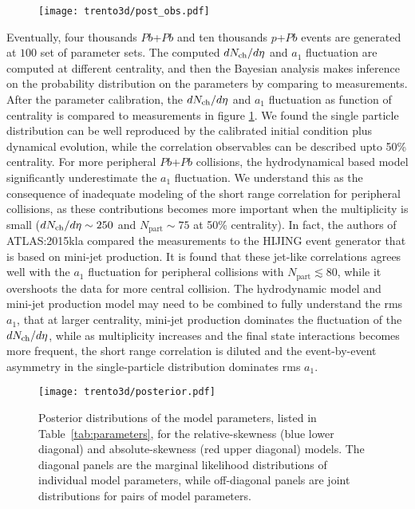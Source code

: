 \begin{figure}
\texttt{[image: trento3d/post\_obs.pdf]}
\caption{}
\label{fig:trento:post_obs}
\end{figure}

Eventually, four thousands $Pb$+$Pb$ and ten thousands $p$+$Pb$ events are generated at $100$ set of parameter sets.
The computed $dN_\text{ch}/d\eta$ and $a_1$ fluctuation are computed at different centrality, and then the Bayesian analysis makes inference on the probability distribution on the parameters by comparing to measurements.
After the parameter calibration, the $dN_\text{ch}/d\eta$ and $a_1$ fluctuation as function of centrality is compared to measurements in figure \ref{fig:trento:post_obs}.
We found the single particle distribution can be well reproduced by the calibrated initial condition plus dynamical evolution, while the correlation observables can be described upto 50\% centrality. 
For more peripheral $Pb$+$Pb$ collisions, the hydrodynamical based model significantly underestimate the $a_1$ fluctuation.
We understand this as the consequence of inadequate modeling of the short range correlation for peripheral collisions, as these contributions becomes more important when the multiplicity is small ($dN_\text{ch}/d\eta\sim 250$ and $N_{\textrm{part}} \sim 75$ at 50\% centrality).
In fact, the authors of {ATLAS:2015kla} compared the measurements to the \mbox{HIJING} event generator that is based on mini-jet production.
It is found that these jet-like correlations agrees well with the $a_1$ fluctuation for peripheral collisions with $N_{\textrm{part}} \lesssim 80$, while it overshoots the data for more central collision.
The hydrodynamic model and mini-jet production model may need to be combined to fully understand the rms $a_1$, that at larger centrality, mini-jet production dominates the fluctuation of the $dN_\text{ch}/d\eta$, while as multiplicity increases and the final state interactions becomes more frequent, the short range correlation is diluted and the event-by-event asymmetry in the single-particle distribution dominates rms $a_1$.

\begin{figure}
\centering
\texttt{[image: trento3d/posterior.pdf]}
\caption{Posterior distributions of the model parameters, listed in Table~\ref{tab:parameters}, for the relative-skewness (blue lower diagonal) and absolute-skewness (red upper diagonal) models. The diagonal panels are the marginal likelihood distributions of individual model parameters, while off-diagonal panels are joint distributions for pairs of model parameters.}
\label{fig:trento:posterior}
\end{figure}

